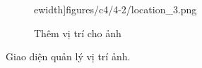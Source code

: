 \begin{figure}[H]
\begin{subfigure}{0.32\textwidth}
ewidth]{figures/c4/4-2/location_3.png} 
        \caption{Thêm vị trí cho ảnh}
    \end{subfigure}
    \caption{Giao diện quản lý vị trí ảnh.}
    \label{fig:explore_location}
\end{figure}

